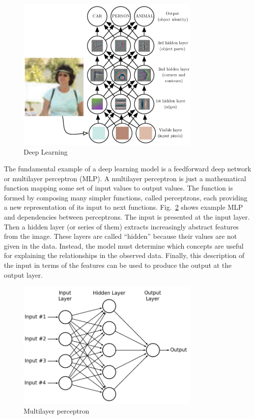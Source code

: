 \begin{figure}[H]
\includegraphics[width=0.8\textwidth,keepaspectratio]{figures/DL.png}
\caption{Deep Learning\protect\cite{Book.DeepLearning}}
\label{Fig.DL}
\end{figure}

The fundamental example of a deep learning model is a feedforward deep network or multilayer perceptron (MLP). A multilayer perceptron is just a mathematical function mapping some set of input values to output values. The function is formed by composing many simpler functions, called perceptrons, each providing a new representation of its input to next functions. Fig.~\ref{Fig.MLP} shows example MLP and dependencies between perceptrons. The input is presented at the input layer. Then a hidden layer (or series of them) extracts increasingly abstract features from the image. These layers are called “hidden” because their values are not given in the data. Instead, the model must determine which concepts are useful for explaining the relationships in the observed data. Finally, this description of the input in terms of the features can be used to produce the output at the output layer.

\begin{figure}[H]
\includegraphics[width=0.8\textwidth,keepaspectratio]{figures/MLP.png}
\caption{Multilayer perceptron}
\label{Fig.MLP}
\end{figure}

